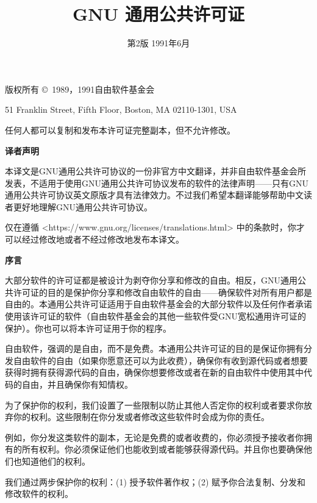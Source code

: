 \documentclass[11pt]{article}
\title{GNU 通用公共许可证}
\date{第2版 \space 1991年6月}
\begin{document}
\maketitle

\begin{center}
{\parindent 0in

版权所有 \copyright\ 1989，1991自由软件基金会

\bigskip

51 Franklin Street, Fifth Floor, Boston, MA  02110-1301, USA

\bigskip

任何人都可以复制和发布本许可证完整副本，但不允许修改。
}
\end{center}

\begin{center}
  {\bf\large 译者声明}
\end{center}

本译文是GNU通用公共许可协议的一份非官方中文翻译，并非自由软件基金会所发表，不适用于使用GNU通用公共许可协议发布的软件的法律声明——只有GNU通用公共许可协议英文原版才具有法律效力。不过我们希望本翻译能够帮助中文读者更好地理解GNU通用公共许可协议。

仅在遵循 <https://www.gnu.org/licenses/translations.html> 中的条款时，你才可以经过修改地或者不经过修改地发布本译文。

\begin{center}
{\bf\large 序言}
\end{center}

大部分软件的许可证都是被设计为剥夺你分享和修改的自由。相反，GNU通用公共许可证的目的是保护你分享和修改自由软件的自由——确保软件对所有用户都是自由的。本通用公共许可证适用于自由软件基金会的大部分软件以及任何作者承诺使用该许可证的软件（自由软件基金会的其他一些软件受GNU宽松通用许可证的保护）。你也可以将本许可证用于你的程序。

自由软件，强调的是自由，而不是免费。本通用公共许可证的目的是保证你拥有分发自由软件的自由（如果你愿意还可以为此收费），确保你有收到源代码或者想要获得时拥有获得源代码的自由，确保你想要修改或者在新的自由软件中使用其中代码的自由，并且确保你有知情权。

为了保护你的权利，我们设置了一些限制以防止其他人否定你的权利或者要求你放弃你的权利。这些限制在你分发或者修改这些软件时会成为你的责任。

例如，你分发这类软件的副本，无论是免费的或者收费的，你必须授予接收者你拥有的所有权利。你必须保证他们也能收到或者能够获得源代码。并且你也要确保他们也知道他们的权利。

我们通过两步保护你的权利：(1) 授予软件著作权；(2) 赋予你合法复制、分发和修改软件的权利。
\end{document}
